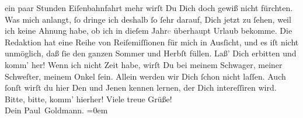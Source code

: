 \begin{ledgroupsized}[t]{13cm}
               ein {\pb}paar Stunden Eiſenbahnfahrt mehr wirſt Du Dich
               doch gewiß nicht fürchten.\pend
           \pstart
           Was mich anlangt, ſo dringe ich deshalb ſo ſehr darauf, Dich jetzt zu ſehen, weil ich
               keine Ahnung habe, ob ich in dieſem Jahr\textcolor{gray}{e} überhaupt Urlaub
               bekomme. Die Redaktion hat eine
               Reihe von Reiſemiſſionen für mich in Ausſicht, und es iſt nicht unmöglich, daß ſie
               den ganzen Sommer und Herbſt füllen. Laß’ Dich erbitten und komm’ her! Wenn ich nicht
               Zeit habe, wirſt Du bei meinem Schwager, meiner Schweſter, meinem Onkel ſein. Allein werden wir Dich ſchon nicht laſſen. Auch ſonſt wirſt du
               hier Den und Jenen kennen lernen, der Dich  intereſſiren wird. Bitte, bitte, komm’ hierher!\pend
           \pstart
           Viele treue Grüße! {\\[\baselineskip]}Dein \spacefill\mbox{Paul Goldmann.}\pend
           \leftskip=0em{}
         
         \endnumbering{}\end{ledgroupsized}  \newcommand{\dateiname}{L02873}\newcommand{\titel}{Paul Goldmann an Arthur Schnitzler, 29. 4. 1899}\newcommand{\editorInnen}{Martin Anton Müller und Laura Untner}
      